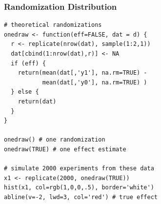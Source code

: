 

\questions


\appendix
\frame{}

\begin{frame}[fragile]

\frametitle{{\large Randomization Distribution}}

\tiny

\begin{verbatim}
# theoretical randomizations
onedraw <- function(eff=FALSE, dat = d) {
  r <- replicate(nrow(dat), sample(1:2,1))
  dat[cbind(1:nrow(dat),r)] <- NA
  if (eff) {
    return(mean(dat[,'y1'], na.rm=TRUE) -
           mean(dat[,'y0'], na.rm=TRUE) )
  } else {
    return(dat)
  }
}

onedraw() # one randomization
onedraw(TRUE) # one effect estimate

# simulate 2000 experiments from these data
x1 <- replicate(2000, onedraw(TRUE))
hist(x1, col=rgb(1,0,0,.5), border='white')
abline(v=-2, lwd=3, col='red') # true effect
\end{verbatim}

\end{frame}


\frame{}



